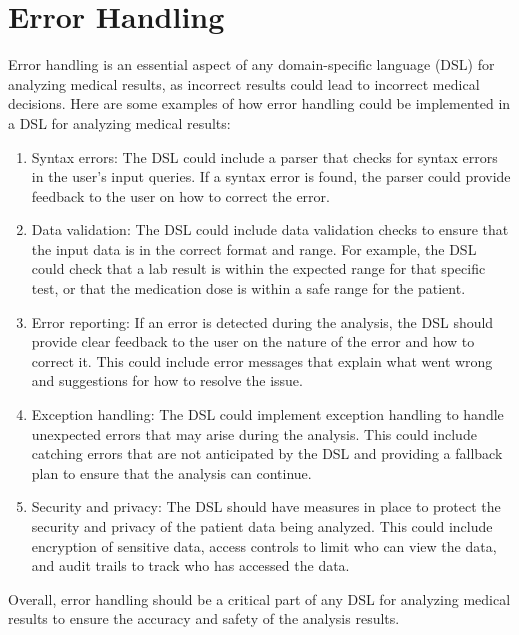 \vspace{0.5cm}
\section{Error Handling}
Error handling is an essential aspect of any domain-specific language (DSL) for analyzing medical results, as incorrect results could lead to incorrect medical decisions. Here are some examples of how error handling could be implemented in a DSL for analyzing medical results:
\begin{enumerate}
    \item Syntax errors: The DSL could include a parser that checks for syntax errors in the user's input queries. If a syntax error is found, the parser could provide feedback to the user on how to correct the error.

    \item Data validation: The DSL could include data validation checks to ensure that the input data is in the correct format and range. For example, the DSL could check that a lab result is within the expected range for that specific test, or that the medication dose is within a safe range for the patient.

    \item Error reporting: If an error is detected during the analysis, the DSL should provide clear feedback to the user on the nature of the error and how to correct it. This could include error messages that explain what went wrong and suggestions for how to resolve the issue.

    \item Exception handling: The DSL could implement exception handling to handle unexpected errors that may arise during the analysis. This could include catching errors that are not anticipated by the DSL and providing a fallback plan to ensure that the analysis can continue.

    \item Security and privacy: The DSL should have measures in place to protect the security and privacy of the patient data being analyzed. This could include encryption of sensitive data, access controls to limit who can view the data, and audit trails to track who has accessed the data.
\end{enumerate}
Overall, error handling should be a critical part of any DSL for analyzing medical results to ensure the accuracy and safety of the analysis results.

\vspace{0.5cm}
